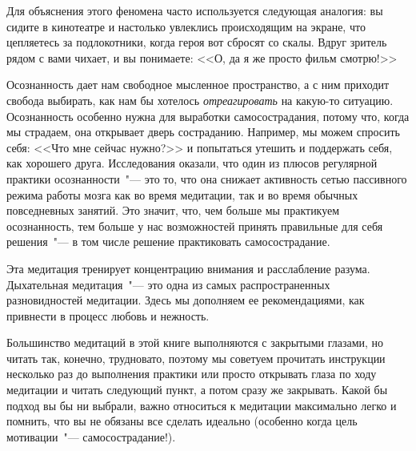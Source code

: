 Для объяснения этого феномена часто используется следующая аналогия: вы сидите в кинотеатре и настолько увлеклись происходящим на экране, что цепляетесь за подлокотники, когда героя вот сбросят со скалы. Вдруг зритель рядом с вами чихает, и вы понимаете: <<О, да я же просто фильм смотрю!>>

Осознанность дает нам свободное мысленное пространство, а с  ним приходит свобода выбирать, как нам бы хотелось \emph{отреагировать} на какую-то ситуацию. Осознанность особенно нужна для выработки самосострадания, потому что, когда мы страдаем, она открывает дверь состраданию. Например, мы можем спросить себя: <<Что мне сейчас нужно?>> и попытаться утешить и поддержать себя, как хорошего друга. Исследования оказали, что один из плюсов регулярной практики осознанности~"--- это то, что она снижает активность сетью пассивного режима работы мозга как во время медитации, так и во время обычных повседневных занятий. Это значит, что, чем больше мы практикуем осознанность, тем больше у нас возможностей принять правильные для себя решения~"--- в том числе решение практиковать самосострадание. 

\newpage
{}\label{medit:Affectionate_Breathing}

Эта медитация тренирует концентрацию внимания и расслабление разума. Дыхательная медитация~"--- это одна из самых распространенных разновидностей медитации. Здесь мы дополняем ее рекомендациями, как привнести в процесс любовь и нежность.

Большинство медитаций в этой книге выполняются с закрытыми глазами, но читать так, конечно, трудновато, поэтому мы советуем прочитать инструкции несколько раз до выполнения практики или просто открывать глаза по ходу медитации и читать следующий пункт, а потом сразу же закрывать. Какой бы подход вы бы ни выбрали, важно относиться к медитации максимально легко и помнить, что вы не обязаны все сделать идеально (особенно когда цель мотивации~"--- самосострадание!).

